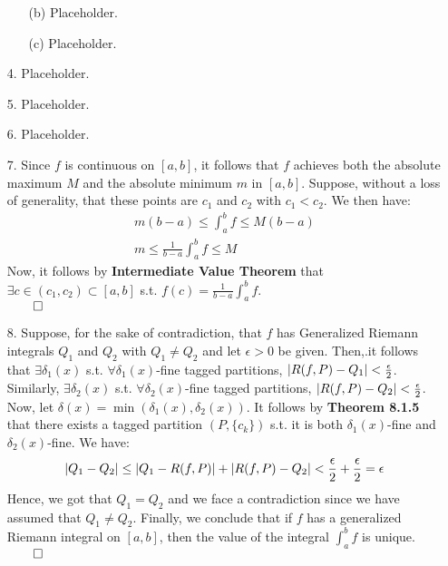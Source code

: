 \documentclass[11pt]{article}
\DeclarePairedDelimiter\abs{\lvert}{\rvert}%
\begin{document}
\begin{itemize}
\begin{itemize}
            \item[(b)]
                Placeholder.

            \item[(c)]
                Placeholder.
        \end{itemize}

    \item[4.]
        Placeholder.

    \item[5.]
        Placeholder.

    \item[6.]
        Placeholder.

    \item[7.]
        Since $f$ is continuous on $[a, b]$, it follows that $f$ achieves both
        the absolute maximum $M$ and the absolute minimum $m$ in $[a, b]$.
        Suppose, without a loss of generality, that these points are $c_1$ and
        $c_2$ with $c_1 < c_2$. We then have:
        \begin{align}
            m (b - a) \leq \int_a^b f \leq M (b - a)\\
            m \leq \frac{1}{b - a} \int_a^b f \leq M
        \end{align}
        Now, it follows by \textbf{Intermediate Value Theorem} that $\exists c
        \in (c_1, c_2) \subset [a, b]$ s.t. $f(c) = \frac{1}{b - a} \int_a^b
        f$.\\
        $\qed$

    \item[8.]
        Suppose, for the sake of contradiction, that $f$ has Generalized
        Riemann integrals $Q_1$ and $Q_2$ with $Q_1 \neq Q_2$ and let $\epsilon
        > 0$ be given. Then,.it follows that $\exists \delta_1(x)$ s.t.
        $\forall \delta_1(x)$-fine tagged partitions, $\abs{R(f, P) - Q_1} <
        \frac{\epsilon}{2}$. Similarly, $\exists \delta_2(x)$ s.t. $\forall
        \delta_2(x)$-fine tagged partitions, $\abs{R(f, P) - Q_2} <
        \frac{\epsilon}{2}$. Now, let $\delta(x) = \min (\delta_1(x),
        \delta_2(x))$. It follows by \textbf{Theorem 8.1.5} that there exists a
        tagged partition $(P, \{c_k\})$ s.t. it is both $\delta_1(x)$-fine and
        $\delta_2(x)$-fine. We have:
        \begin{equation*}
            \abs{Q_1 - Q_2} \leq \abs{Q_1 - R(f, P)} + \abs{R(f, P) - Q_2}
                            < \frac{\epsilon}{2} + \frac{\epsilon}{2}
                            = \epsilon
        \end{equation*}
        Hence, we got that $Q_1 = Q_2$ and we face a contradiction since we
        have assumed that $Q_1 \neq Q_2$. Finally, we conclude that if $f$ has
        a generalized Riemann integral on $[a, b]$, then the value of the
        integral $\int_a^b f$ is unique.\\
        $\qed$


\end{itemize}
\end{document}
